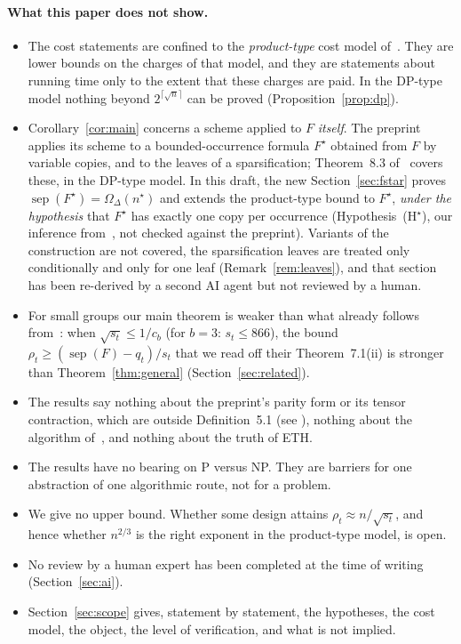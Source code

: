 \documentclass[11pt,a4paper]{article}
\theoremstyle{definition}
\theoremstyle{remark}
\newcommand{\sep}{\operatorname{sep}}
\begin{document}
\paragraph{What this paper does not show.}
\begin{itemize}
\item The cost statements are confined to the \emph{product-type} cost model
 of~\cite[Section~5.2]{DL}. They are lower bounds on the charges of that model, and they are
 statements about running time only to the extent that these charges are paid. In the
 DP-type model nothing beyond $2^{\lceil\sqrt n\rceil}$ can be proved
 (Proposition~\ref{prop:dp}).
\item Corollary~\ref{cor:main} concerns a scheme applied to $F$ \emph{itself}. The preprint
 applies its scheme to a bounded-occurrence formula $F^\star$ obtained from $F$ by variable
 copies, and to the leaves of a sparsification; Theorem~8.3 of~\cite{DL} covers these, in
 the DP-type model. In this draft, the new Section~\ref{sec:fstar} proves
 $\sep(F^\star)=\Omega_\Delta(n^\star)$ and extends the product-type bound to $F^\star$,
 \emph{under the hypothesis} that $F^\star$ has exactly one copy per occurrence
 (Hypothesis~(H$^\star$), our inference from~\cite{DL}, not checked against the preprint).
 Variants of the construction are not covered, the sparsification leaves are treated only
 conditionally and only for one leaf (Remark~\ref{rem:leaves}), and that section has been
 re-derived by a second AI agent but not reviewed by a human.
\item For small groups our main theorem is weaker than what already follows
 from~\cite{DL}: when $\sqrt{s_t}\le1/c_b$ (for $b=3$: $s_t\le866$), the bound
 $\rho_t\ge(\sep(F)-q_t)/s_t$ that we read off their Theorem~7.1(ii) is stronger than
 Theorem~\ref{thm:general} (Section~\ref{sec:related}).
\item The results say nothing about the preprint's parity form or its tensor contraction,
 which are outside Definition~5.1 (see \cite[Section~5.1]{DL}), nothing about the algorithm
 of~\cite{Claude}, and nothing about the truth of ETH.
\item The results have no bearing on P versus NP. They are barriers for one abstraction of
 one algorithmic route, not for a problem.
\item We give no upper bound. Whether some design attains $\rho_t\approx n/\sqrt{s_t}$, and
 hence whether $n^{2/3}$ is the right exponent in the product-type model, is open.
\item No review by a human expert has been completed at the time of writing
 (Section~\ref{sec:ai}).
\item Section~\ref{sec:scope} gives, statement by statement, the hypotheses, the cost model,
 the object, the level of verification, and what is not implied.
\end{itemize}
\end{document}
